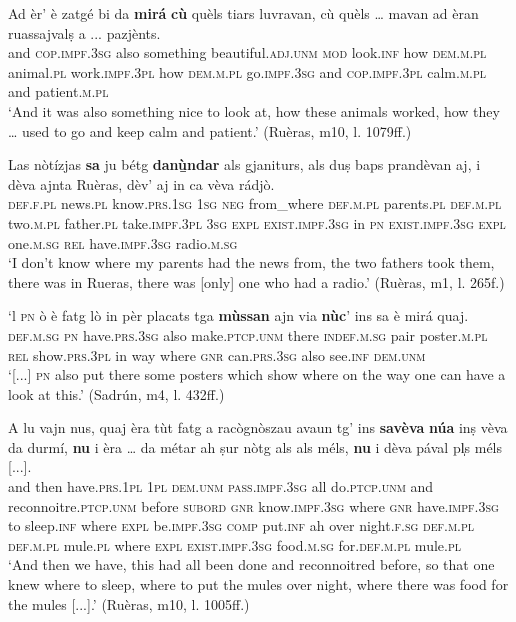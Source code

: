 \ea
\label{ex:indinterr2}
\gll   Ad èr' è zatgé bi da \textbf{mirá} \textbf{cù} quèls tiars luvravan, cù quèls … mavan ad èran ruassajvalṣ a ... pazjènts.\\
and \textsc{cop.impf.3sg} also something beautiful.\textsc{adj.unm} \textsc{mod} look.\textsc{inf} how \textsc{dem.m.pl} animal.\textsc{pl} work.\textsc{impf.3pl} how \textsc{dem.m.pl} {} go.\textsc{impf.3sg} and \textsc{cop.impf.3pl} calm.\textsc{m.pl} {} and patient.\textsc{m.pl}  \\
\glt `And it was also something nice to look at, how these animals worked, how they … used to go and keep calm and patient.' (Ruèras, m10, l. 1079ff.)
\z

\ea
\label{ex:indinterr3}
\gll    Las nòtízjas \textbf{sa} ju bétg \textbf{danù̱ndar} als gjaniturs, als duṣ baps prandèvan aj, i dèva ajnta Ruèras, dèv’ aj in ca vèva rádjò. \\
\textsc{def.f.pl} news.\textsc{pl} know.\textsc{prs.1sg} \textsc{1sg} \textsc{neg} from\_where \textsc{def.m.pl} parents.\textsc{pl} \textsc{def.m.pl} two.\textsc{m.pl} father.\textsc{pl} take.\textsc{impf.3pl} \textsc{3sg} \textsc{expl} \textsc{exist.impf.3sg} in \textsc{pn} \textsc{exist.impf.3sg} \textsc{expl}  one.\textsc{m.sg} \textsc{rel} have.\textsc{impf.3sg} radio.\textsc{m.sg}\\
\glt `I don’t know where my parents had the news from, the two fathers took them, there was in Rueras, there was [only] one who had a radio.' (Ruèras, m1, l. 265f.)
\z

\ea
\label{ex:indinterr4}
\gll [...] `l \textsc{pn} ò è fatg lò in pèr placats tga \textbf{mùssan} ajn via \textbf{nùc}’ ins sa è mirá quaj.\\
{} \textsc{def.m.sg} \textsc{pn} have.\textsc{prs.3sg} also make.\textsc{ptcp.unm} there \textsc{indef.m.sg} pair poster.\textsc{m.pl} \textsc{rel} show.\textsc{prs.3pl} in way where \textsc{gnr} can.\textsc{prs.3sg} also see.\textsc{inf} \textsc{dem.unm} \\
\glt `[...] \textsc{pn} also put there some posters which show where on the way one can have a look at this.' (Sadrún, m4, l. 432ff.)
\z

\ea
\label{ex:indinterr5}
\gll A lu vajn nus, quaj èra tùt fatg a racògnòszau avaun tg’ ins \textbf{savèva} \textbf{núa} inṣ vèva da durmí, \textbf{nu} i èra … da métar ah ṣur nòtg als als méls, \textbf{nu} i dèva pával pl̩s méls [...]. \\
and then have.\textsc{prs.1pl} \textsc{1pl} \textsc{dem.unm} \textsc{pass.impf.3sg} all do.\textsc{ptcp.unm} and  reconnoitre.\textsc{ptcp.unm} before \textsc{subord} \textsc{gnr}  know.\textsc{impf.3sg} where \textsc{gnr} have.\textsc{impf.3sg} to sleep.\textsc{inf} where \textsc{expl} be.\textsc{impf.3sg} {} \textsc{comp} put.\textsc{inf} ah over night.\textsc{f.sg} \textsc{def.m.pl} \textsc{def.m.pl} mule.\textsc{pl} where \textsc{expl} \textsc{exist.impf.3sg} food.\textsc{m.sg} for.\textsc{def.m.pl} mule.\textsc{pl}\\
\glt `And then we have, this had all been done and reconnoitred before, so that one knew where to sleep, where to put the mules over night, where there was food for the mules [...].' (Ruèras, m10, l. 1005ff.)
\z

